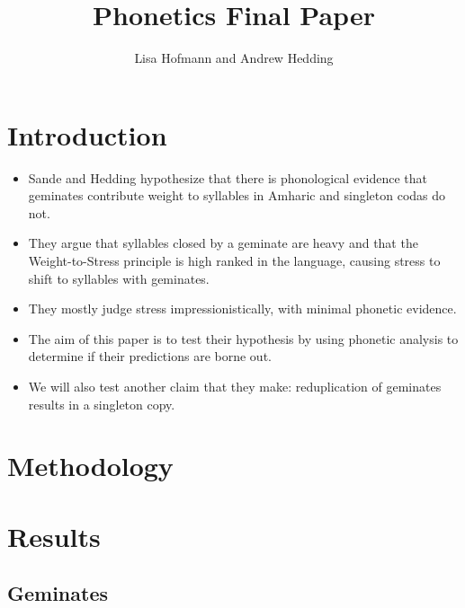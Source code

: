 \documentclass[12pt]{article}
\title{Phonetics Final Paper}
\author{Lisa Hofmann and Andrew Hedding}
\begin{document}
\maketitle
\section{Introduction}
\begin{itemize}
	\item Sande and Hedding hypothesize that there is phonological evidence that geminates contribute weight to syllables in Amharic and singleton codas do not.
	\item They argue that syllables closed by a geminate are heavy and that the Weight-to-Stress principle is high ranked in the language, causing stress to shift to syllables with geminates. 
	\item They mostly judge stress impressionistically, with minimal phonetic evidence. 
	\item The aim of this paper is to test their hypothesis by using phonetic analysis to determine if their predictions are borne out.
	\item We will also test another claim that they make: reduplication of geminates results in a singleton copy.	
\end{itemize}
\section{Methodology}
\section{Results}
\subsection{Geminates}
\end{document}
